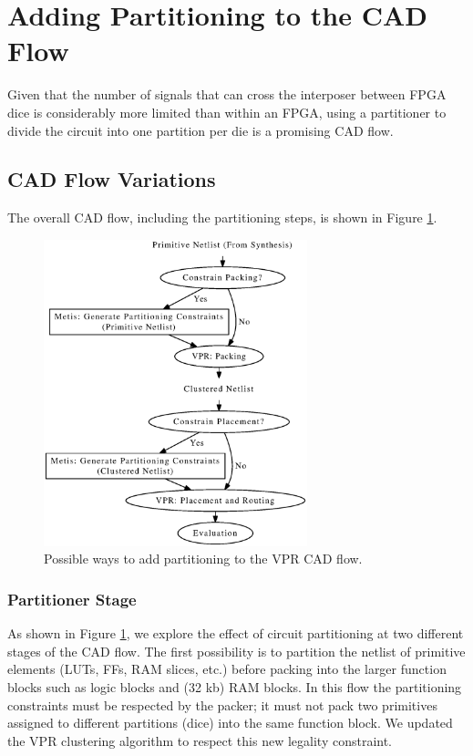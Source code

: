 \section{Adding Partitioning to the CAD Flow}
\label{sec:CADflow}
Given that the number of signals that can cross the interposer between FPGA dice is considerably more limited than within an FPGA, using a partitioner to divide the circuit into one partition per die is a promising CAD flow.

\subsection{CAD Flow Variations}
The overall CAD flow, including the partitioning steps, is shown in Figure \ref{fig:partitioning_cad_flow}.
\begin{figure}[!htbp]
\centering
\includegraphics[height=3.5in]{partitioning_cad_flow.eps}
\caption{Possible ways to add partitioning to the VPR CAD flow.}
\label{fig:partitioning_cad_flow}
\end{figure}

\subsubsection{Partitioner Stage}\label{sec:partitioner_stage}
As shown in Figure \ref{fig:partitioning_cad_flow}, we explore the effect of circuit partitioning at two different stages of the CAD flow. The first possibility is to partition the netlist of primitive elements (LUTs, FFs, RAM slices, etc.) before packing into the larger function blocks such as logic blocks and (32 kb) RAM blocks. In this flow the partitioning constraints must be respected by the packer; it must not pack two primitives assigned to different partitions (dice) into the same function block. We updated the VPR clustering algorithm to respect this new legality constraint.

